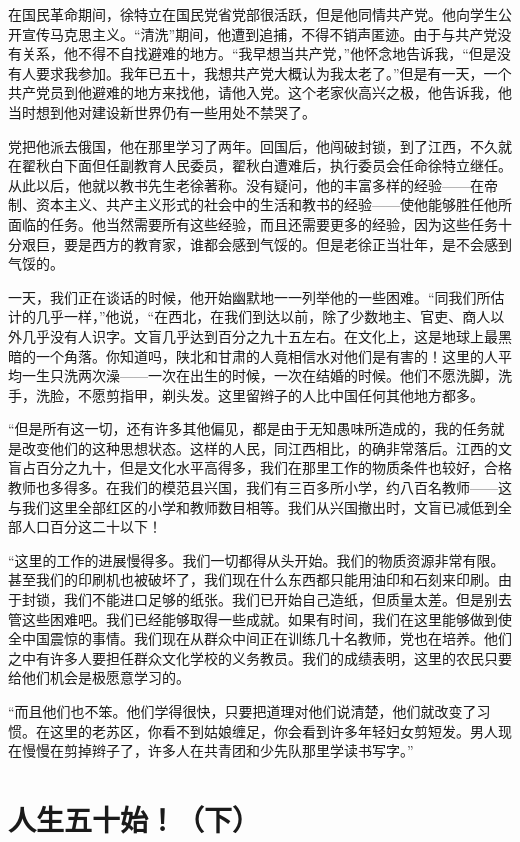 \documentclass[10pt]{book}
\begin{document}
在国民革命期间，徐特立在国民党省党部很活跃，但是他同情共产党。他向学生公开宣传马克思主义。“清洗”期间，他遭到追捕，不得不销声匿迹。由于与共产党没有关系，他不得不自找避难的地方。“我早想当共产党，”他怀念地告诉我，“但是没有人要求我参加。我年已五十，我想共产党大概认为我太老了。”但是有一天，一个共产党员到他避难的地方来找他，请他入党。这个老家伙高兴之极，他告诉我，他当时想到他对建设新世界仍有一些用处不禁哭了。

党把他派去俄国，他在那里学习了两年。回国后，他闯破封锁，到了江西，不久就在翟秋白下面但任副教育人民委员，翟秋白遭难后，执行委员会任命徐特立继任。从此以后，他就以教书先生老徐著称。没有疑问，他的丰富多样的经验——在帝制、资本主义、共产主义形式的社会中的生活和教书的经验——使他能够胜任他所面临的任务。他当然需要所有这些经验，而且还需要更多的经验，因为这些任务十分艰巨，要是西方的教育家，谁都会感到气馁的。但是老徐正当壮年，是不会感到气馁的。

一天，我们正在谈话的时候，他开始幽默地一一列举他的一些困难。“同我们所估计的几乎一样，”他说，“在西北，在我们到达以前，除了少数地主、官吏、商人以外几乎没有人识字。文盲几乎达到百分之九十五左右。在文化上，这是地球上最黑暗的一个角落。你知道吗，陕北和甘肃的人竟相信水对他们是有害的！这里的人平均一生只洗两次澡——一次在出生的时候，一次在结婚的时候。他们不愿洗脚，洗手，洗脸，不愿剪指甲，剃头发。这里留辫子的人比中国任何其他地方都多。

“但是所有这一切，还有许多其他偏见，都是由于无知愚味所造成的，我的任务就是改变他们的这种思想状态。这样的人民，同江西相比，的确非常落后。江西的文盲占百分之九十，但是文化水平高得多，我们在那里工作的物质条件也较好，合格教师也多得多。在我们的模范县兴国，我们有三百多所小学，约八百名教师——这与我们这里全部红区的小学和教师数目相等。我们从兴国撤出时，文盲已减低到全部人口百分这二十以下！

“这里的工作的进展慢得多。我们一切都得从头开始。我们的物质资源非常有限。甚至我们的印刷机也被破坏了，我们现在什么东西都只能用油印和石刻来印刷。由于封锁，我们不能进口足够的纸张。我们已开始自己造纸，但质量太差。但是别去管这些困难吧。我们已经能够取得一些成就。如果有时间，我们在这里能够做到使全中国震惊的事情。我们现在从群众中间正在训练几十名教师，党也在培养。他们之中有许多人要担任群众文化学校的义务教员。我们的成绩表明，这里的农民只要给他们机会是极愿意学习的。

“而且他们也不笨。他们学得很快，只要把道理对他们说清楚，他们就改变了习惯。在这里的老苏区，你看不到姑娘缠足，你会看到许多年轻妇女剪短发。男人现在慢慢在剪掉辫子了，许多人在共青团和少先队那里学读书写字。”

\section{人生五十始！（下）}
\end{document}
